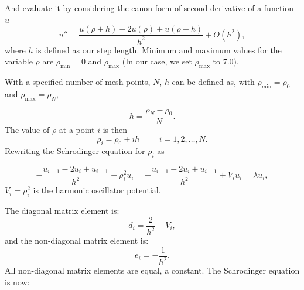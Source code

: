 \documentclass[%
reprint,
superscriptaddress,
showpacs,
nofootinbib,
bibnotes,amsmath,amssymb,aps,
prc, 
]{revtex4-1}
\begin{document}
	And evaluate it by considering the canon form of second derivative of a function $u$
	\begin{equation}
	u''=\frac{u(\rho+h) -2u(\rho) +u(\rho-h)}{h^2} +O(h^2),
	\label{eq:diffoperation}
	\end{equation}
	where $h$ is defined as our step length.
	Minimum and maximum values for the variable $\rho$ are
	$\rho_{\mathrm{min}}=0$  and $\rho_{\mathrm{max}}$
	(In our case, we set $\rho_{\mathrm{max}}$ to 7.0).
	
	With a specified number of mesh points, $N$, 
	$h$ can be defined as, with $\rho_{\mathrm{min}}=\rho_0$  and $\rho_{\mathrm{max}}=\rho_N$,
	
	\begin{equation*}
		h=\frac{\rho_N-\rho_0 }{N}.
	\end{equation*}
	The value of $\rho$ at a point $i$ is then 
	\[
	\rho_i= \rho_0 + ih \hspace{1cm} i=1,2,\dots , N.
	\]
	Rewriting the Schr$\ddot{\textrm{o}}$dinger equation for $\rho_i$ as
	
	\[
	-\frac{u_{i+1} -2u_i +u_{i-1}}{h^2}+\rho_i^2u_i=-\frac{u_{i+1} -2u_i +u_{i-1} }{h^2}+V_iu_i  = \lambda u_i,
	\]
	$V_i=\rho_i^2$ is the harmonic oscillator potential.
	
	The diagonal matrix element is:
	\begin{equation*}
		d_i=\frac{2}{h^2}+V_i,
	\end{equation*}
	and the non-diagonal matrix element is:
	\begin{equation*}
		e_i=-\frac{1}{h^2}.
	\end{equation*}
	All non-diagonal matrix elements are equal, a constant.
	The Schr$\ddot{\textrm{o}}$dinger equation is now:
	
\end{document}

